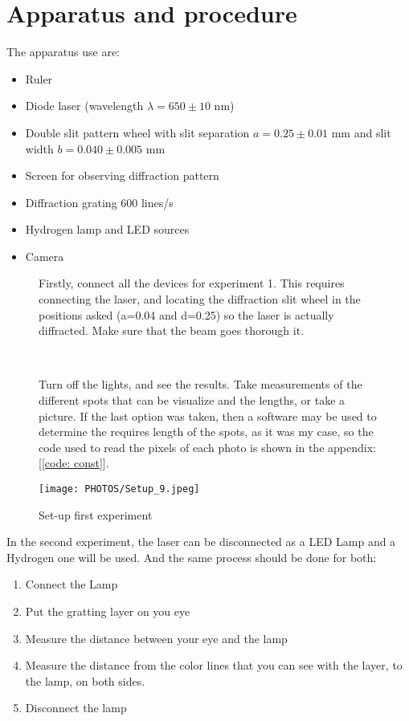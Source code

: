 \section{Apparatus and procedure}
\vspace*{-4 mm}
\noindent The apparatus  use are:
\vspace*{-2 mm}
\begin{itemize}
    \item Ruler
    \item Diode laser (wavelength $\lambda = 650 \pm 10$ nm)
    \item Double slit pattern wheel with slit separation $a = 0.25 \pm 0.01$ mm and slit width $b = 0.040 \pm 0.005$ mm
    \item Screen for observing diffraction pattern
    \item Diffraction grating 600 lines/s
    \item Hydrogen lamp and LED sources
    \item Camera
\end{itemize}



\begin{figure}[H]
    \begin{minipage}[c]{.50\linewidth}
    Firstly, connect all the devices for experiment 1. This requires connecting the laser, and locating the diffraction slit wheel in the positions asked (a=0.04 and  d=0.25) so the laser is actually diffracted. Make sure that the beam goes thorough it. 

    \

    Turn off the lights, and see the results. Take measurements of the different spots that can be visualize and the lengths, or take a picture. If the last option was taken, then a software may be used to determine the requires length of the spots, as it was my case, so the code used to read the pixels of each photo is shown in the appendix: [\ref{code: const}].
    \end{minipage}
    \hfill
    \begin{minipage}[c]{.47\linewidth}
    \texttt{[image: PHOTOS/Setup\_9.jpeg]}
    \caption{Set-up first experiment}
    \label{fig: setup}
    \end{minipage}
\end{figure}


In the second experiment, the laser can be disconnected as a LED Lamp and a Hydrogen one will be used. And the same process should be done for both:
\begin{enumerate}
    \item Connect the Lamp
    \item Put the gratting layer on you eye
    \item Measure the distance between your eye and the lamp
    \item Measure the distance from the color lines that you can see with the layer, to the lamp, on both sides.
    \item Disconnect the lamp
\end{enumerate}

